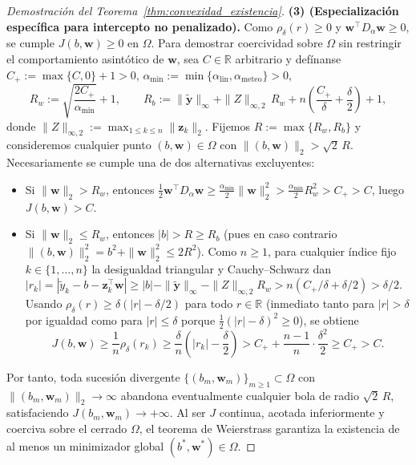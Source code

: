 \begin{proof}[Demostración del Teorema~\ref{thm:convexidad_existencia}]
\textbf{(3) (Especialización específica para intercepto no penalizado).} Como $\rho_\delta(r) \ge 0$ y $\mathbf{w}^\top D_\alpha \mathbf{w} \ge 0$, se cumple $J(b,\mathbf{w}) \ge 0$ en $\Omega$. Para demostrar coercividad sobre $\Omega$ sin restringir el comportamiento asintótico de $\mathbf{w}$, sea $C \in \mathbb{R}$ arbitrario y defínanse $C_+ := \max\{C, 0\} + 1 > 0$, $\alpha_{\min} := \min\{\alpha_{\mathrm{lin}}, \alpha_{\mathrm{meteo}}\} > 0$,
\[
R_w := \sqrt{\frac{2 C_+}{\alpha_{\min}}} + 1, \qquad
R_b := \|\tilde{\mathbf{y}}\|_\infty + \|Z\|_{\infty,2}\,R_w + n\left(\frac{C_+}{\delta} + \frac{\delta}{2}\right) + 1,
\]
donde $\|Z\|_{\infty,2} := \max_{1 \le k \le n} \|\mathbf{z}_k\|_2$. Fijemos $R := \max\{R_w, R_b\}$ y consideremos cualquier punto $(b, \mathbf{w}) \in \Omega$ con $\|(b, \mathbf{w})\|_2 > \sqrt{2}\,R$. Necesariamente se cumple una de dos alternativas excluyentes:
\begin{itemize}
    \item Si $\|\mathbf{w}\|_2 > R_w$, entonces $\frac{1}{2}\mathbf{w}^\top D_\alpha \mathbf{w} \ge \frac{\alpha_{\min}}{2}\|\mathbf{w}\|_2^2 > \frac{\alpha_{\min}}{2} R_w^2 > C_+ > C$, luego $J(b, \mathbf{w}) > C$.
    \item Si $\|\mathbf{w}\|_2 \le R_w$, entonces $|b| > R \ge R_b$ (pues en caso contrario $\|(b,\mathbf{w})\|_2^2 = b^2 + \|\mathbf{w}\|_2^2 \le 2R^2$). Como $n \ge 1$, para cualquier índice fijo $k \in \{1,\dots,n\}$ la desigualdad triangular y Cauchy--Schwarz dan $|r_k| = |\tilde{y}_k - b - \mathbf{z}_k^\top \mathbf{w}| \ge |b| - \|\tilde{\mathbf{y}}\|_\infty - \|Z\|_{\infty,2} R_w > n(C_+/\delta + \delta/2) > \delta/2$. Usando $\rho_\delta(r) \ge \delta(|r| - \delta/2)$ para todo $r \in \mathbb{R}$ (inmediato tanto para $|r| > \delta$ por igualdad como para $|r| \le \delta$ porque $\frac{1}{2}(|r|-\delta)^2 \ge 0$), se obtiene
    \[
    J(b, \mathbf{w}) \ge \frac{1}{n}\rho_\delta(r_k) \ge \frac{\delta}{n}\left(|r_k| - \frac{\delta}{2}\right) > C_+ + \frac{n - 1}{n}\cdot\frac{\delta^2}{2} \ge C_+ > C.
    \]
\end{itemize}
Por tanto, toda sucesión divergente $\{(b_m, \mathbf{w}_m)\}_{m \ge 1} \subset \Omega$ con $\|(b_m, \mathbf{w}_m)\|_2 \to \infty$ abandona eventualmente cualquier bola de radio $\sqrt{2}\,R$, satisfaciendo $J(b_m, \mathbf{w}_m) \to +\infty$. Al ser $J$ continua, acotada inferiormente y coerciva sobre el cerrado $\Omega$, el teorema de Weierstrass garantiza la existencia de al menos un minimizador global $(b^*, \mathbf{w}^*) \in \Omega$.
\end{proof}

